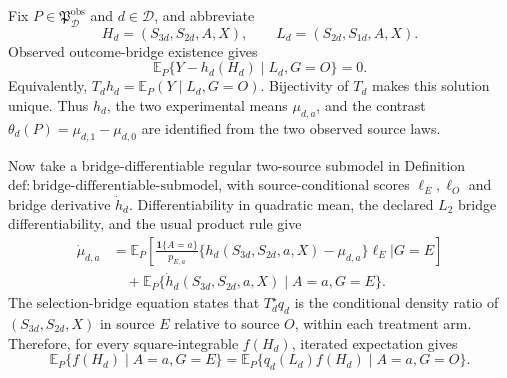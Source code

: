 Fix \(P\in\mathfrak P_{\mathcal D}^{\mathrm{obs}}\) and \(d\in\mathcal D\), and abbreviate
\[
 H_d=(S_{3d},S_{2d},A,X),\qquad L_d=(S_{2d},S_{1d},A,X).
\]
Observed outcome-bridge existence gives
\[
 \mathbb E_P\{Y-h_d(H_d)\mid L_d,G=O\}=0. \tag{1}
\]
Equivalently, \(T_dh_d=\mathbb E_P(Y\mid L_d,G=O)\).  Bijectivity of \(T_d\) makes this solution unique.  Thus \(h_d\), the two experimental means \(\mu_{d,a}\), and the contrast \(\theta_d(P)=\mu_{d,1}-\mu_{d,0}\) are identified from the two observed source laws.

Now take a bridge-differentiable regular two-source submodel in Definition~\(\mathrm{def{:}bridge\text{-}differentiable\text{-}submodel}\), with source-conditional scores \(\ell_E,\ell_O\) and bridge derivative \(\dot h_d\).  Differentiability in quadratic mean, the declared \(L_2\) bridge differentiability, and the usual product rule give
\[
\begin{aligned}
 \dot\mu_{d,a}
 &={\mathbb E}_P\!\left[
   \frac{\mathbf 1\{A=a\}}{p_{E,a}}
   \{h_d(S_{3d},S_{2d},a,X)-\mu_{d,a}\}\ell_E
   \mathrel{\Big|}G=E\right]\\
 &\quad+{\mathbb E}_P\{\dot h_d(S_{3d},S_{2d},a,X)\mid A=a,G=E\}. \tag{2}
\end{aligned}
\]
The selection-bridge equation states that \(T_d^\star q_d\) is the conditional density ratio of \((S_{3d},S_{2d},X)\) in source \(E\) relative to source \(O\), within each treatment arm.  Therefore, for every square-integrable \(f(H_d)\), iterated expectation gives
\[
 {\mathbb E}_P\{f(H_d)\mid A=a,G=E\}
 ={\mathbb E}_P\{q_d(L_d)f(H_d)\mid A=a,G=O\}. \tag{3}
\]

